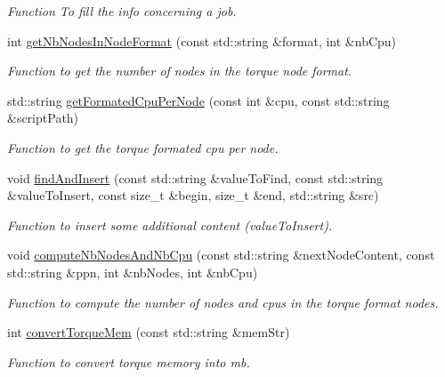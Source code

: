 \begin{DoxyCompactItemize}
\begin{DoxyCompactList}\small\item\em Function To fill the info concerning a job. \item\end{DoxyCompactList}\item 
int \hyperlink{classTorqueServer_a3abd12ff06eb1774669d03b3f6f85f22}{getNbNodesInNodeFormat} (const std::string \&format, int \&nbCpu)
\begin{DoxyCompactList}\small\item\em Function to get the number of nodes in the torque node format. \item\end{DoxyCompactList}\item 
std::string \hyperlink{classTorqueServer_aa43c09a2a522df515a6b0b4334ed96d8}{getFormatedCpuPerNode} (const int \&cpu, const std::string \&scriptPath)
\begin{DoxyCompactList}\small\item\em Function to get the torque formated cpu per node. \item\end{DoxyCompactList}\item 
void \hyperlink{classTorqueServer_ad7eff84c7ffb7596b28e80650aa59c2b}{findAndInsert} (const std::string \&valueToFind, const std::string \&valueToInsert, const size\_\-t \&begin, size\_\-t \&end, std::string \&src)
\begin{DoxyCompactList}\small\item\em Function to insert some additional content (valueToInsert). \item\end{DoxyCompactList}\item 
void \hyperlink{classTorqueServer_a78dc1909e07eaf03854d423696b30c4e}{computeNbNodesAndNbCpu} (const std::string \&nextNodeContent, const std::string \&ppn, int \&nbNodes, int \&nbCpu)
\begin{DoxyCompactList}\small\item\em Function to compute the number of nodes and cpus in the torque format nodes. \item\end{DoxyCompactList}\item 
int \hyperlink{classTorqueServer_ac5675d4a8fa217925824a146ac93750f}{convertTorqueMem} (const std::string \&memStr)
\begin{DoxyCompactList}\small\item\em Function to convert torque memory into mb. \item\end{DoxyCompactList}\end{DoxyCompactItemize}
